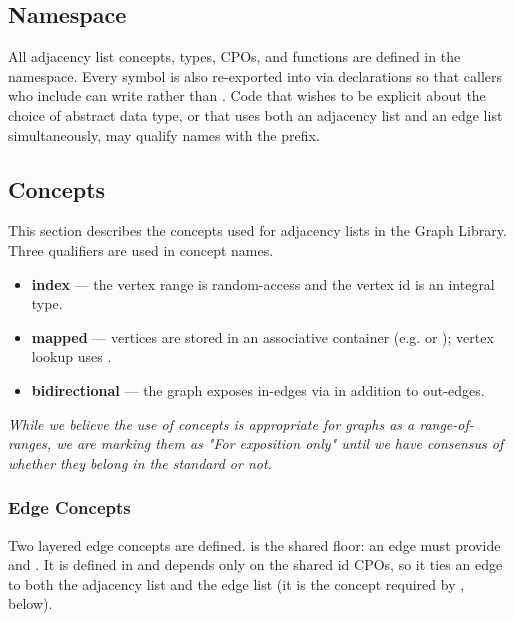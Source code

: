\subsection{Namespace}
All adjacency list concepts, types, CPOs, and functions are defined in the 
namespace. Every symbol is also re-exported into  via  declarations so that
callers who include  can write  rather than
. Code that wishes to be explicit about the choice of abstract data
type, or that uses both an adjacency list and an edge list simultaneously, may qualify names with the
 prefix.

\subsection{Concepts}

This section describes the concepts used for adjacency lists in the Graph Library. Three qualifiers are used in concept names.
\begin{itemize}
    \item \textbf{index} — the vertex range is random-access and the vertex id is an integral type.
    \item \textbf{mapped} — vertices are stored in an associative container (e.g. or ); vertex lookup uses .
    \item \textbf{bidirectional} — the graph exposes in-edges via  in addition to out-edges.
\end{itemize}

\emph{While we believe the use of concepts is appropriate for graphs as a range-of-ranges, we are marking them as "For exposition only" 
until we have consensus of whether they belong in the standard or not.}

\subsubsection{Edge Concepts}
Two layered edge concepts are defined.  is the shared floor: an edge must
provide  and . It is defined in  and depends only
on the shared id CPOs, so it ties an edge to both the adjacency list and the edge list (it is the concept
required by , below).

